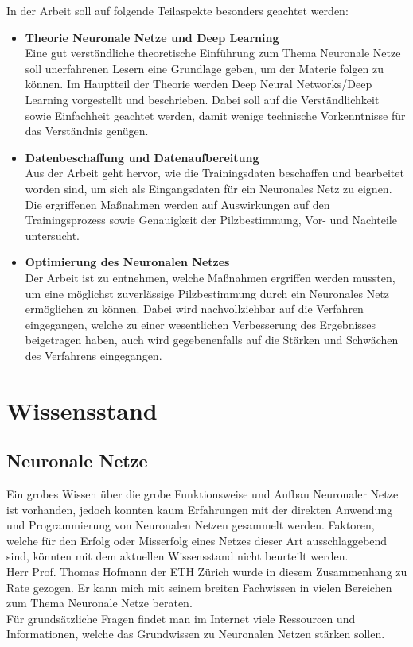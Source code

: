 \noindent
In der Arbeit soll auf folgende Teilaspekte besonders geachtet werden:
\begin{itemize}
	\item \textbf{Theorie Neuronale Netze und Deep Learning}\\
	Eine gut verständliche theoretische Einführung zum Thema Neuronale Netze soll unerfahrenen Lesern eine Grundlage geben, um der Materie folgen zu können. Im Hauptteil der Theorie werden Deep Neural Networks/Deep Learning vorgestellt und beschrieben. Dabei soll auf die Verständlichkeit sowie Einfachheit geachtet werden, damit wenige technische Vorkenntnisse für das Verständnis genügen.
	\item \textbf{Datenbeschaffung und Datenaufbereitung}\\
	Aus der Arbeit geht hervor, wie die Trainingsdaten beschaffen und bearbeitet worden sind, um sich als Eingangsdaten für ein Neuronales Netz zu eignen. Die ergriffenen Maßnahmen werden auf Auswirkungen auf den Trainingsprozess sowie Genauigkeit der Pilzbestimmung, Vor- und Nachteile untersucht.
	\item \textbf{Optimierung des Neuronalen Netzes}\\
	Der Arbeit ist zu entnehmen, welche Maßnahmen ergriffen werden mussten, um eine möglichst zuverlässige Pilzbestimmung durch ein Neuronales Netz ermöglichen zu können. Dabei wird nachvollziehbar auf die Verfahren eingegangen, welche zu einer wesentlichen Verbesserung des Ergebnisses beigetragen haben, auch wird gegebenenfalls auf die Stärken und Schwächen des Verfahrens eingegangen.
	\end{itemize}
	
\section{Wissensstand}
\subsection{Neuronale Netze}
Ein grobes Wissen über die grobe Funktionsweise und Aufbau Neuronaler Netze ist vorhanden, jedoch konnten kaum Erfahrungen mit der direkten Anwendung und Programmierung von Neuronalen Netzen gesammelt werden. Faktoren, welche für den Erfolg oder Misserfolg eines Netzes dieser Art ausschlaggebend sind, könnten mit dem aktuellen Wissensstand nicht beurteilt werden.\\
Herr Prof. Thomas Hofmann der ETH Zürich wurde in diesem Zusammenhang zu Rate gezogen. Er kann mich mit seinem breiten Fachwissen in vielen Bereichen zum Thema Neuronale Netze beraten.\\
Für grundsätzliche Fragen findet man im Internet viele Ressourcen und Informationen, welche das Grundwissen zu Neuronalen Netzen stärken sollen.
	
